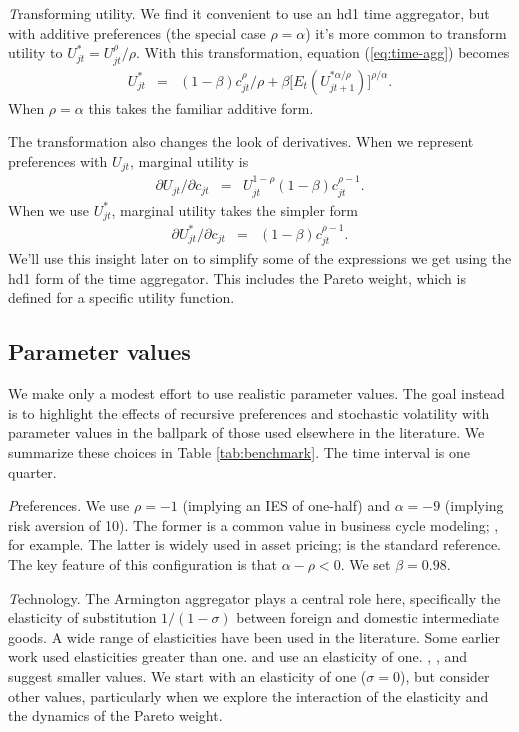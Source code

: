 {\textit Transforming utility.\/}
We find it convenient to use an hd1 time aggregator, but with additive preferences
(the special case $\rho = \alpha$)
it's more common to transform utility to
$ {U}^{*}_{jt} = U_{jt}^\rho/\rho$.
With this transformation, equation (\ref{eq:time-agg}) becomes
\begin{eqnarray}
    {U}^{*}_{jt} &=& (1-\beta) c_{jt}^\rho/\rho
            + \beta \big[ E_t (U_{jt+1}^{* \alpha/\rho}) \big]^{\rho/\alpha} .
    \label{eq:utility-additive}
\end{eqnarray}
When $\rho=\alpha$ this takes the familiar additive form.

The transformation also changes the look of derivatives.
When we represent preferences with $U_{jt}$, marginal utility is
\begin{eqnarray*}
    \partial U_{jt} /\partial c_{jt} &=& U_{jt}^{1-\rho} (1-\beta) c_{jt}^{\rho-1} .
\end{eqnarray*}
When we use ${U}^*_{jt}$, marginal utility takes the simpler form
\begin{eqnarray*}
    \partial {U}^*_{jt} /\partial c_{jt} &=&  (1-\beta) c_{jt}^{\rho-1} .
\end{eqnarray*}
We'll use this insight later on to simplify some of the expressions we get
using the hd1 form of the time aggregator.
This includes the Pareto weight, which is defined for a specific
utility function.


\subsection{Parameter values}

We make only a modest effort to use realistic parameter values.
The goal instead is to highlight the effects of recursive preferences and
stochastic volatility with parameter values in the ballpark of those used
elsewhere in the literature.
We summarize these choices in Table \ref{tab:benchmark}.
The time interval is one quarter.

{\textit Preferences.\/}
We use $\rho=-1$ (implying an IES of one-half)
and $\alpha = -9$ (implying risk aversion of 10).
The former is a common value in business cycle modeling; \citet{Kydland1982-xy}, for example.
The latter is widely used in asset pricing; \citet{Bansal2004-mb} is the standard reference.
The key feature of this configuration is that $\alpha-\rho < 0$.
We set $\beta = 0.98$.


{\textit Technology.\/}
The Armington aggregator plays a central role here,
specifically the elasticity of substitution $1/(1-\sigma)$
between foreign and domestic intermediate goods.
A wide range of elasticities have been used in the literature.
Some earlier work used elasticities greater than one.
\citet{Colacito2011-zp,Colacito2013-yq} and \citet{Kollmann2015-sy} use an elasticity of one.
\citet[Section 3.2]{Heathcote2002-aw}, \citet[Table 1]{Tretvoll2018-dj}, and \citet[Table 3]{Tretvoll2015-lo} suggest
smaller values.
We start with an elasticity of one ($\sigma = 0$),
but consider other values, particularly when we explore the interaction
of the elasticity and the dynamics of the Pareto weight.

